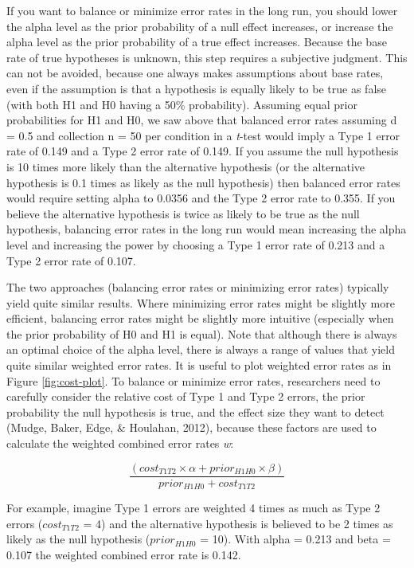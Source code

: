 \documentclass[
  english,
  ,jou, a4paper,floatsintext]{apa6}
\begin{document}
If you want to balance or minimize error rates in the long run, you should lower the alpha level as the prior probability of a null effect increases, or increase the alpha level as the prior probability of a true effect increases. Because the base rate of true hypotheses is unknown, this step requires a subjective judgment. This can not be avoided, because one always makes assumptions about base rates, even if the assumption is that a hypothesis is equally likely to be true as false (with both H1 and H0 having a 50\% probability). Assuming equal prior probabilities for H1 and H0, we saw above that balanced error rates assuming d = 0.5 and collection n = 50 per condition in a \emph{t}-test would imply a Type 1 error rate of 0.149 and a Type 2 error rate of 0.149. If you assume the null hypothesis is 10 times more likely than the alternative hypothesis (or the alternative hypothesis is 0.1 times as likely as the null hypothesis) then balanced error rates would require setting alpha to 0.0356 and the Type 2 error rate to 0.355. If you believe the alternative hypothesis is twice as likely to be true as the null hypothesis, balancing error rates in the long run would mean increasing the alpha level and increasing the power by choosing a Type 1 error rate of 0.213 and a Type 2 error rate of 0.107.

The two approaches (balancing error rates or minimizing error rates) typically yield quite similar results. Where minimizing error rates might be slightly more efficient, balancing error rates might be slightly more intuitive (especially when the prior probability of H0 and H1 is equal). Note that although there is always an optimal choice of the alpha level, there is always a range of values that yield quite similar weighted error rates. It is useful to plot weighted error rates as in Figure \ref{fig:cost-plot}. To balance or minimize error rates, researchers need to carefully consider the relative cost of Type 1 and Type 2 errors, the prior probability the null hypothesis is true, and the effect size they want to detect (Mudge, Baker, Edge, \& Houlahan, 2012), because these factors are used to calculate the weighted combined error rates \emph{w}:

\begin{equation}
\frac{(cost_{T1T2} \times \alpha + prior_{H1H0} \times \beta)}{prior_{H1H0}+cost_{T1T2}}
\label{eq:minimize}
\end{equation}

For example, imagine Type 1 errors are weighted 4 times as much as Type 2 errors (\(cost_{T1T2}\) = 4) and the alternative hypothesis is believed to be 2 times as likely as the null hypothesis (\(prior_{H1H0}\) = 10). With alpha = 0.213 and beta = 0.107 the weighted combined error rate is 0.142.
\end{document}
